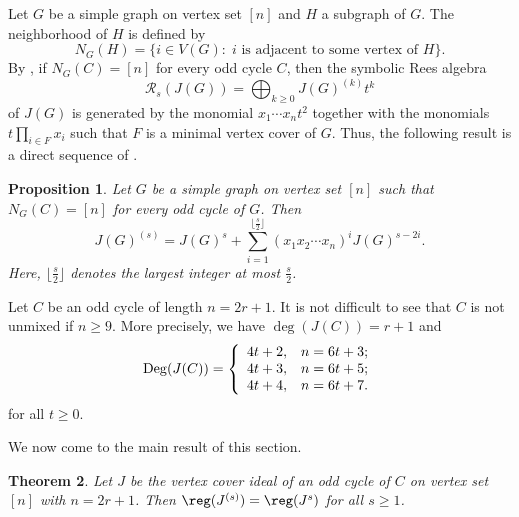 \documentclass[12pt]{amsart}
\let\:=\colon
\newtheorem{Theorem}{Theorem}[section]
\newtheorem{Proposition}[Theorem]{Proposition}
\begin{document}
Let $G$  be a simple graph on vertex set $[n]$ and $H$  a subgraph of $G$. The neighborhood of $H$ is defined by
$$N_G(H)=\{i\in V(G)\:\; i \mbox{ is adjacent to some vertex of } H \}.$$
 By \cite[Proposition 5.3]{HHT},  if $N_G(C)=[n]$ for every odd cycle $C$, then the symbolic Rees algebra $$\mathcal{R}_s(J(G))=\bigoplus_{k\geq 0} J(G)^{(k)}t^k$$ of $J(G)$  is generated by the monomial $x_1\cdots x_nt^2$ together with  the monomials  $t\prod_{i\in F}x_i$ such that $F$  is a minimal vertex cover of $G$. Thus,  the following result is a direct sequence of \cite[Proposition 5.3]{HHT}.
\begin{Proposition} \label{herzog} Let $G$ be  a simple graph on vertex set $[n]$ such that $N_G(C)=[n]$ for every odd cycle of $G$. Then $$J(G)^{(s)}=J(G)^s+\sum_{i=1}^{\lfloor\frac{s}{2}\rfloor}(x_1x_2\cdots x_{n})^iJ(G)^{s-2i}.$$
Here, $\lfloor\frac{s}{2}\rfloor$ denotes the largest integer at most $\frac{s}{2}$.
\end{Proposition}








Let $C$ be an odd cycle of length $n=2r+1$. It is not difficult to see that $C$ is not unmixed if $n\geq 9$. More precisely, we have $\deg(J(C))=r+1$ and $$\mathrm{Deg}(J(C))=\left\{
                                                                                                     \begin{array}{ll}
                                                                                                       4t+2, & \hbox{$n=6t+3$;} \\
                                                                                                       4t+3, & \hbox{$n=6t+5$;} \\
                                                                                                       4t+4, & \hbox{$n=6t+7$.}
                                                                                                     \end{array}
                                                                                                   \right.
$$ for all $t\geq 0$.

We now come to the main result of this section.

\begin{Theorem} \label{main1} Let $J$ be the vertex cover ideal of an  odd cycle of $C$ on  vertex set $[n]$ with $n=2r+1$. Then $\reg(J^{(s)})=\reg(J^s)$ for all $s\geq 1$.

\end{Theorem}
\end{document}
